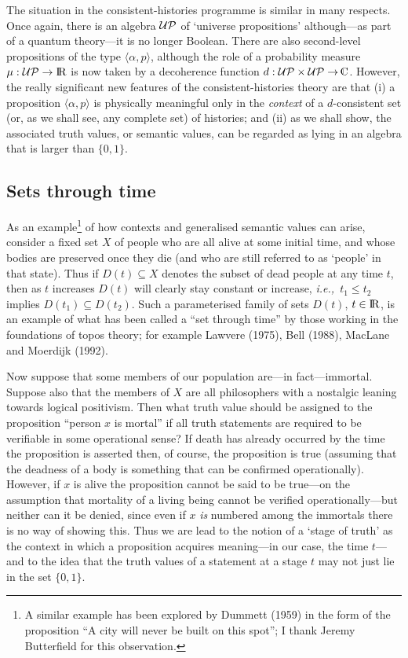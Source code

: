 \documentclass[12pt]{article}
\newcounter{def-number}[section]
\newcommand{\ie}{{\em i.e.,\ }}
\renewcommand{\a}{\alpha}                   %
\newcommand{\gp}[2]{\langle#1,#2\rangle}
\newcommand{\m}{\mu}
\newcommand{\map}{\rightarrow}
\newcommand\mathC{\mkern1mu\raise2.2pt\hbox{$\scriptscriptstyle|$}
                {\mkern-7mu\rm C}}
\newcommand{\mathR}{{\rm I\! R}}                %
\newcommand{\UP}{{\cal UP}}
\begin{document}
	The situation in the consistent-histories programme is similar
in many respects. Once again, there is an algebra $\UP$ of `universe
propositions' although---as part of a quantum theory---it is no
longer Boolean. There are also second-level propositions of the type
$\gp{\a}p$, although the role of a probability measure
$\m:\UP\map\mathR$ is now taken by a decoherence function
$d:\UP\times\UP\map\mathC$.  However, the really significant new
features of the consistent-histories theory are that (i) a
proposition $\gp{\a}{p}$ is physically meaningful only in the {\em
context\/} of a $d$-consistent set (or, as we shall see, any
complete set) of histories; and (ii) as we shall show, the
associated truth values, or semantic values, can be regarded as
lying in an algebra that is larger than $\{0,1\}$.


\subsection{Sets through time}
As an example\footnote{A similar example has been explored by
Dummett (1959) in the form of the proposition ``A city will never be
built on this spot''; I thank Jeremy Butterfield for this
observation.} of how contexts and generalised semantic values can
arise, consider a fixed set $X$ of people who are all alive at some
initial time, and whose bodies are preserved once they die (and who
are still referred to as `people' in that state).  Thus if
$D(t)\subseteq X$ denotes the subset of dead people at any time $t$,
then as $t$ increases $D(t)$ will clearly stay constant or increase,
\ie $t_1\leq t_2$ implies $D(t_1)\subseteq D(t_2)$. Such a
parameterised family of sets $D(t)$, $t\in\mathR$, is an example of
what has been called a ``set through time'' by those working in the
foundations of topos theory; for example Lawvere (1975), Bell
(1988), MacLane and Moerdijk (1992).  

	Now suppose that some members of our population are---in
fact---immortal. Suppose also that the members of $X$ are all
philosophers with a nostalgic leaning towards logical positivism.
Then what truth value should be assigned to the proposition ``person
$x$ is mortal'' if all truth statements are required to be
verifiable in some operational sense?  If death has already occurred
by the time the proposition is asserted then, of course, the
proposition is true (assuming that the deadness of a body is
something that can be confirmed operationally).  However, if $x$ is
alive the proposition cannot be said to be true---on the assumption
that mortality of a living being cannot be verified
operationally---but neither can it be denied, since even if $x$ {\em
is\/} numbered among the immortals there is no way of showing this.
Thus we are lead to the notion of a `stage of truth' as the context
in which a proposition acquires meaning---in our case, the time
$t$---and to the idea that the truth values of a statement at a
stage $t$ may not just lie in the set $\{0,1\}$.
\end{document}
